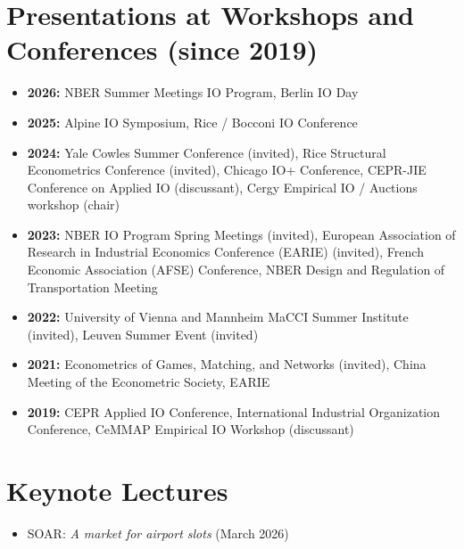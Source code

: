 \documentclass[11pt,a4paper]{article}
\begin{document}
\section*{Presentations at Workshops and Conferences (since 2019)}
\begin{itemize}
\renewcommand{\labelitemi}{\fontsize{4}{4}\selectfont$\blacksquare$}
\item \textbf{2026:} NBER Summer Meetings IO Program, Berlin IO Day \vspace{0.15cm}
\item \textbf{2025:} Alpine IO Symposium, Rice / Bocconi IO Conference \vspace{0.15cm}
\item \textbf{2024:} Yale Cowles Summer Conference (invited), Rice Structural Econometrics Conference (invited), Chicago IO+ Conference, CEPR-JIE Conference on Applied IO (discussant), Cergy Empirical IO / Auctions workshop (chair) \vspace{0.15cm}
\item \textbf{2023:} NBER IO Program Spring Meetings (invited), European Association of Research in Industrial Economics Conference (EARIE) (invited), French Economic Association (AFSE) Conference, NBER Design and Regulation of Transportation Meeting \vspace{0.15cm}
\item \textbf{2022:} University of Vienna and Mannheim MaCCI Summer Institute (invited), Leuven Summer Event (invited) \vspace{0.15cm}
\item \textbf{2021:} Econometrics of Games, Matching, and Networks (invited), China Meeting of the Econometric Society, EARIE \vspace{0.15cm}
\item \textbf{2019:} CEPR Applied IO Conference, International Industrial Organization Conference, CeMMAP Empirical IO Workshop (discussant) \vspace{0.15cm}
\end{itemize}


\section*{Keynote Lectures}
\begin{itemize}
\renewcommand{\labelitemi}{\fontsize{4}{4}\selectfont$\blacksquare$}
\item SOAR: \emph{A market for airport slots} (March 2026)
\end{itemize}
\end{document}
